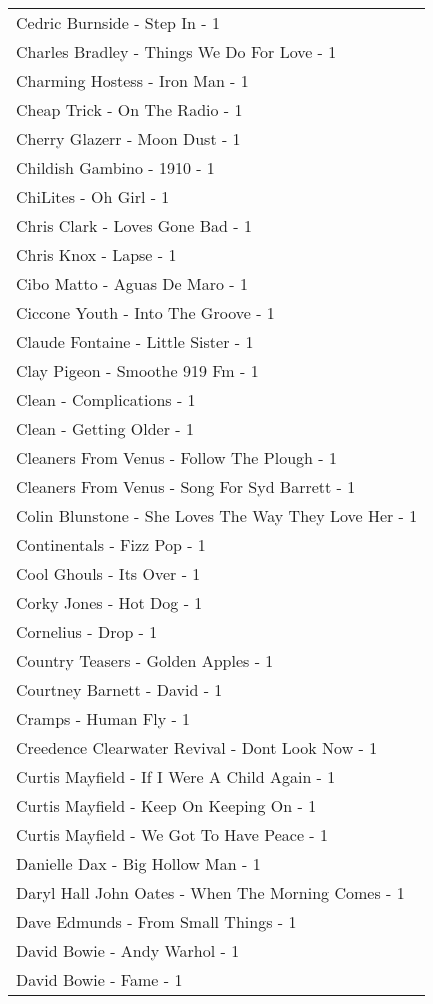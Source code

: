 \documentclass[
]{article}
\begin{document}
\begin{longtable}{l}
Cedric Burnside - Step In - 1 \\ 
Charles Bradley - Things We Do For Love - 1 \\ 
Charming Hostess - Iron Man - 1 \\ 
Cheap Trick - On The Radio - 1 \\ 
Cherry Glazerr - Moon Dust - 1 \\ 
Childish Gambino - 1910 - 1 \\ 
ChiLites - Oh Girl - 1 \\ 
Chris Clark - Loves Gone Bad - 1 \\ 
Chris Knox - Lapse - 1 \\ 
Cibo Matto - Aguas De Maro - 1 \\ 
Ciccone Youth - Into The Groove - 1 \\ 
Claude Fontaine - Little Sister - 1 \\ 
Clay Pigeon - Smoothe 919 Fm - 1 \\ 
Clean - Complications - 1 \\ 
Clean - Getting Older - 1 \\ 
Cleaners From Venus - Follow The Plough - 1 \\ 
Cleaners From Venus - Song For Syd Barrett - 1 \\ 
Colin Blunstone - She Loves The Way They Love Her - 1 \\ 
Continentals - Fizz Pop - 1 \\ 
Cool Ghouls - Its Over - 1 \\ 
Corky Jones - Hot Dog - 1 \\ 
Cornelius - Drop - 1 \\ 
Country Teasers - Golden Apples - 1 \\ 
Courtney Barnett - David - 1 \\ 
Cramps - Human Fly - 1 \\ 
Creedence Clearwater Revival - Dont Look Now - 1 \\ 
Curtis Mayfield - If I Were A Child Again - 1 \\ 
Curtis Mayfield - Keep On Keeping On - 1 \\ 
Curtis Mayfield - We Got To Have Peace - 1 \\ 
Danielle Dax - Big Hollow Man - 1 \\ 
Daryl Hall John Oates - When The Morning Comes - 1 \\ 
Dave Edmunds - From Small Things - 1 \\ 
David Bowie - Andy Warhol - 1 \\ 
David Bowie - Fame - 1 \\ 

\end{longtable}
\end{document}

